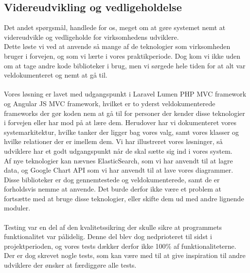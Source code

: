 \subsection{Videreudvikling og vedligeholdelse}
Det andet spørgsmål, handlede for os, meget om at gøre systemet nemt at videreudvikle og vedligeholde for virksomhedens udviklere.
\\
Dette løste vi ved at anvende så mange af de teknologier som virksomheden bruger i forvejen, og som vi lærte i vores praktikperiode. Dog kom vi ikke uden om at tage andre kode biblioteker i brug, men vi sørgede hele tiden for at alt var veldokumenteret og nemt at gå til. 
\\\\
Vores løsning er lavet med udgangspunkt i Laravel Lumen PHP MVC framework og Angular JS MVC framework, hvilket er to yderst
veldokumenterede frameworks der gør koden nem at gå til for personer der kender disse teknologier i forvejen eller har mod på at lære dem.
Herudover har vi dokumenteret vores systemarkitektur, hvilke tanker der ligger bag vores valg, samt vores klasser og hvilke relationer der er imellem dem.
Vi har illustreret vores løsninger, så udviklere har et godt udgangspunkt når de skal sætte sig ind i vores system.
\\
Af nye teknologier kan nævnes ElasticSearch, som vi har anvendt til at lagre data, og Google Chart API som vi har anvendt til at
lave vores diagrammer.
Disse biblioteker er dog gennemtestede og veldokumenterede, samt de er forholdsvis nemme at anvende.
Det burde derfor ikke være et problem at fortsætte med at bruge disse teknologier, eller skifte dem ud med andre lignende moduler.
\\\\
Testing var en del af den kvalitetssikring der skulle sikre at programmets funktionalitet var pålidelig.
Denne del blev dog nedprioteret til sidst i projektperioden, og vores tests dækker derfor ikke 100\% af funktionaliteterne.
Der er dog skrevet nogle tests, som kan være med til at give inspiration til andre udviklere der ønsker at færdiggøre alle tests.
